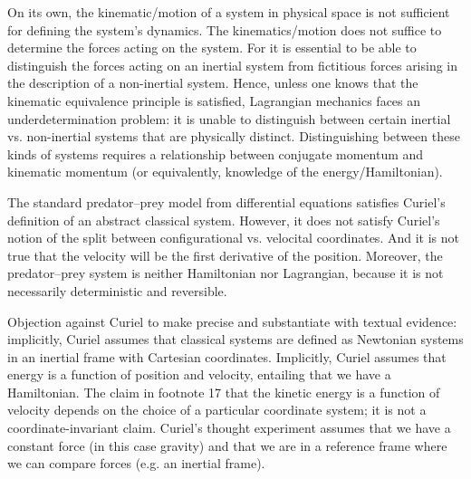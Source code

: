 \documentclass[letterpaper]{article}
\begin{document}
On its own, the kinematic/motion of a system in physical space is not sufficient for defining the system's dynamics. The kinematics/motion does not suffice to determine the forces acting on the system. For it is essential to be able to distinguish the forces acting on an inertial system from fictitious forces arising in the description of a non-inertial system. Hence, unless one knows that the kinematic equivalence principle is satisfied, Lagrangian mechanics faces an underdetermination problem: it is unable to distinguish between certain inertial vs. non-inertial systems that are physically distinct. Distinguishing between these kinds of systems requires a relationship between conjugate momentum and kinematic momentum (or equivalently, knowledge of the energy/Hamiltonian).

The standard predator--prey model from differential equations satisfies Curiel's definition of an abstract classical system. However, it does not satisfy Curiel's notion of the split between configurational vs. velocital coordinates. And it is not true that the velocity will be the first derivative of the position. Moreover, the predator--prey system is neither Hamiltonian nor Lagrangian, because it is not necessarily deterministic and reversible.

Objection against Curiel to make precise and substantiate with textual evidence: implicitly, Curiel assumes that classical systems are defined as Newtonian systems in an inertial frame with Cartesian coordinates. Implicitly, Curiel assumes that energy is a function of position and velocity, entailing that we have a Hamiltonian. The claim in footnote 17 that the kinetic energy is a function of velocity depends on the choice of a particular coordinate system; it is not a coordinate-invariant claim. Curiel's thought experiment assumes that we have a constant force (in this case gravity) and that we are in a reference frame where we can compare forces (e.g. an inertial frame).
\end{document}
